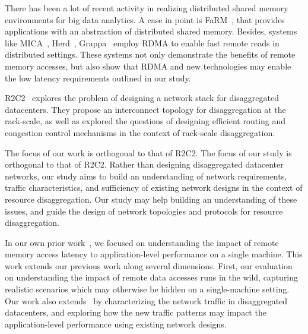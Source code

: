 There has been a lot of recent activity in realizing distributed shared memory environments for big data analytics. A case in point is FaRM~\cite{farm}, that provides applications with an abstraction of distributed shared memory. Besides, systems like MICA~\cite{mica}, Herd~\cite{herd}, Grappa~\cite{grappa} employ RDMA to enable fast remote reads in distributed settings. These systems not only demonstrate the benefits of remote memory accesses, but also show that RDMA and new technologies may enable the low latency requirements outlined in our study.


R2C2~\cite{r2c2} explores the problem of designing a network stack for disaggregated datacenters. They propose an interconnect topology for disaggregation at the rack-scale, as well as explored the questions of designing efficient routing and congestion control mechanisms in the context of rack-scale disaggregation.

The focus of our work is orthogonal to that of R2C2. The focus of our study is orthogonal to that of R2C2. Rather than designing disaggregated datacenter networks, our study aims to build an understanding of network requirements, traffic characteristics, and sufficiency of existing network designs in the context of resource disaggregation. Our study may help building an understanding of these issues, and guide the design of network topologies and protocols for resource disaggregation. 


In our own prior work~\cite{hotnets}, we focused on understanding the impact of remote memory access latency to application-level performance on a single machine. This work extends our previous work along several dimensions. First, our evaluation on understanding the impact of remote data accesses runs in the wild, capturing realistic scenarios which may otherwise be hidden on a single-machine setting. Our work also extends~\cite{hotnets} by characterizing the network traffic in disaggregated datacenters, and exploring how the new traffic patterns may impact the application-level performance using existing network designs. 






